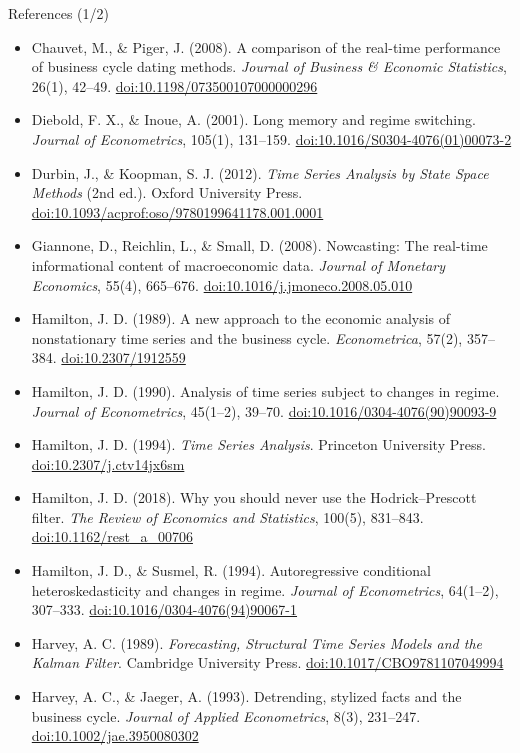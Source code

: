 \begin{frame}{References (1/2)}
\itemsize{\scriptsize}
\begin{itemize}
    \item Chauvet, M., \& Piger, J. (2008). A comparison of the real-time performance of business cycle dating methods. \textit{Journal of Business \& Economic Statistics}, 26(1), 42--49. \href{https://doi.org/10.1198/073500107000000296}{doi:10.1198/073500107000000296}
    \item Diebold, F. X., \& Inoue, A. (2001). Long memory and regime switching. \textit{Journal of Econometrics}, 105(1), 131--159. \href{https://doi.org/10.1016/S0304-4076(01)00073-2}{doi:10.1016/S0304-4076(01)00073-2}
    \item Durbin, J., \& Koopman, S. J. (2012). \textit{Time Series Analysis by State Space Methods} (2nd ed.). Oxford University Press. \href{https://doi.org/10.1093/acprof:oso/9780199641178.001.0001}{doi:10.1093/acprof:oso/9780199641178.001.0001}
    \item Giannone, D., Reichlin, L., \& Small, D. (2008). Nowcasting: The real-time informational content of macroeconomic data. \textit{Journal of Monetary Economics}, 55(4), 665--676. \href{https://doi.org/10.1016/j.jmoneco.2008.05.010}{doi:10.1016/j.jmoneco.2008.05.010}
    \item Hamilton, J. D. (1989). A new approach to the economic analysis of nonstationary time series and the business cycle. \textit{Econometrica}, 57(2), 357--384. \href{https://doi.org/10.2307/1912559}{doi:10.2307/1912559}
    \item Hamilton, J. D. (1990). Analysis of time series subject to changes in regime. \textit{Journal of Econometrics}, 45(1--2), 39--70. \href{https://doi.org/10.1016/0304-4076(90)90093-9}{doi:10.1016/0304-4076(90)90093-9}
    \item Hamilton, J. D. (1994). \textit{Time Series Analysis}. Princeton University Press. \href{https://doi.org/10.2307/j.ctv14jx6sm}{doi:10.2307/j.ctv14jx6sm}
    \item Hamilton, J. D. (2018). Why you should never use the Hodrick--Prescott filter. \textit{The Review of Economics and Statistics}, 100(5), 831--843. \href{https://doi.org/10.1162/rest\_a\_00706}{doi:10.1162/rest\_a\_00706}
    \item Hamilton, J. D., \& Susmel, R. (1994). Autoregressive conditional heteroskedasticity and changes in regime. \textit{Journal of Econometrics}, 64(1--2), 307--333. \href{https://doi.org/10.1016/0304-4076(94)90067-1}{doi:10.1016/0304-4076(94)90067-1}
    \item Harvey, A. C. (1989). \textit{Forecasting, Structural Time Series Models and the Kalman Filter}. Cambridge University Press. \href{https://doi.org/10.1017/CBO9781107049994}{doi:10.1017/CBO9781107049994}
    \item Harvey, A. C., \& Jaeger, A. (1993). Detrending, stylized facts and the business cycle. \textit{Journal of Applied Econometrics}, 8(3), 231--247. \href{https://doi.org/10.1002/jae.3950080302}{doi:10.1002/jae.3950080302}
\end{itemize}
\end{frame}

